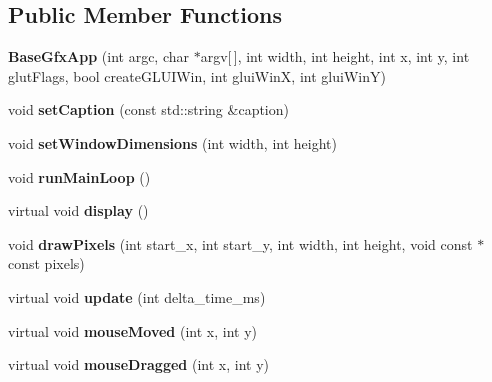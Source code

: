 \subsection*{Public Member Functions}
\begin{DoxyCompactItemize}
\item 
{\bfseries Base\+Gfx\+App} (int argc, char $\ast$argv\mbox{[}$\,$\mbox{]}, int width, int height, int x, int y, int glut\+Flags, bool create\+G\+L\+U\+I\+Win, int glui\+WinX, int glui\+WinY)\hypertarget{classBaseGfxApp_a534a4b5293a35947fdae3805a103541d}{}\label{classBaseGfxApp_a534a4b5293a35947fdae3805a103541d}

\item 
void {\bfseries set\+Caption} (const std\+::string \&caption)\hypertarget{classBaseGfxApp_a4b3b1a475b7f2babaf1b477c34b15fb1}{}\label{classBaseGfxApp_a4b3b1a475b7f2babaf1b477c34b15fb1}

\item 
void {\bfseries set\+Window\+Dimensions} (int width, int height)\hypertarget{classBaseGfxApp_a32fb420886f442d6be6b391a2ed3ecc1}{}\label{classBaseGfxApp_a32fb420886f442d6be6b391a2ed3ecc1}

\item 
void {\bfseries run\+Main\+Loop} ()\hypertarget{classBaseGfxApp_acda031916c00d56c2dc901e2653e3083}{}\label{classBaseGfxApp_acda031916c00d56c2dc901e2653e3083}

\item 
virtual void {\bfseries display} ()\hypertarget{classBaseGfxApp_ac8de2d5a955582547af5619b771b4d6d}{}\label{classBaseGfxApp_ac8de2d5a955582547af5619b771b4d6d}

\item 
void {\bfseries draw\+Pixels} (int start\+\_\+x, int start\+\_\+y, int width, int height, void const $\ast$const pixels)\hypertarget{classBaseGfxApp_a4b8d896c2fff8482553207552bc54f0a}{}\label{classBaseGfxApp_a4b8d896c2fff8482553207552bc54f0a}

\item 
virtual void {\bfseries update} (int delta\+\_\+time\+\_\+ms)\hypertarget{classBaseGfxApp_a67737f7cc360b008394b1e882ed5b5d6}{}\label{classBaseGfxApp_a67737f7cc360b008394b1e882ed5b5d6}

\item 
virtual void {\bfseries mouse\+Moved} (int x, int y)\hypertarget{classBaseGfxApp_a0956b82d7fa58b623c498aea7073dbba}{}\label{classBaseGfxApp_a0956b82d7fa58b623c498aea7073dbba}

\item 
virtual void {\bfseries mouse\+Dragged} (int x, int y)\hypertarget{classBaseGfxApp_abb23f716dd6612b3a72938e41525d338}{}\label{classBaseGfxApp_abb23f716dd6612b3a72938e41525d338}


\end{DoxyCompactItemize}
